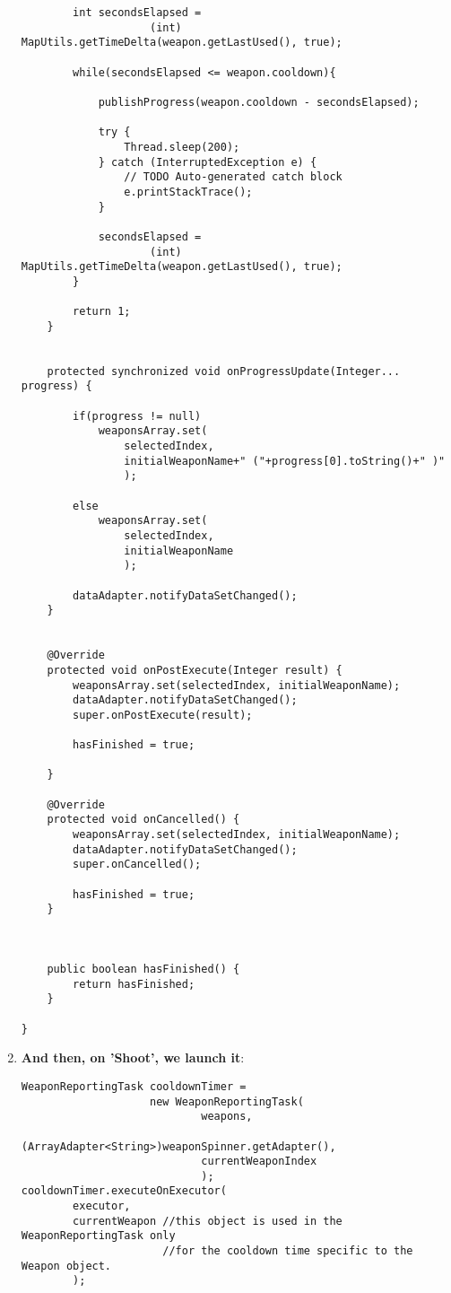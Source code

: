\begin{enumerate}
\begin{verbatim}
 		int secondsElapsed = 
 					(int) MapUtils.getTimeDelta(weapon.getLastUsed(), true);
 		
 		while(secondsElapsed <= weapon.cooldown){
 			
 			publishProgress(weapon.cooldown - secondsElapsed);
 			
 			try {
				Thread.sleep(200);
			} catch (InterruptedException e) {
				// TODO Auto-generated catch block
				e.printStackTrace();
			}
 			
 			secondsElapsed = 
 					(int) MapUtils.getTimeDelta(weapon.getLastUsed(), true);
 		}
 		
 		return 1;
 	}
     
    
    protected synchronized void onProgressUpdate(Integer... progress) {
    	
    	if(progress != null)
    		weaponsArray.set(
    			selectedIndex, 
    			initialWeaponName+" ("+progress[0].toString()+" )"
    			);
    	
    	else 
    		weaponsArray.set(
    			selectedIndex, 
    			initialWeaponName
    			);
    	
    	dataAdapter.notifyDataSetChanged();
    }

    
    @Override
    protected void onPostExecute(Integer result) {
    	weaponsArray.set(selectedIndex, initialWeaponName);
    	dataAdapter.notifyDataSetChanged();    	
    	super.onPostExecute(result);
    	
    	hasFinished = true;
    	
    }
    
    @Override
    protected void onCancelled() {
    	weaponsArray.set(selectedIndex, initialWeaponName);
    	dataAdapter.notifyDataSetChanged();
    	super.onCancelled();
    	
    	hasFinished = true;
    }



	public boolean hasFinished() {
		return hasFinished;
	}
    
}

\end{verbatim}

  \item \textbf{And then, on 'Shoot', we launch it}:

\begin{verbatim}
WeaponReportingTask cooldownTimer = 
					new WeaponReportingTask(
							weapons,
							(ArrayAdapter<String>)weaponSpinner.getAdapter(),
							currentWeaponIndex
							);
cooldownTimer.executeOnExecutor(
		executor,
		currentWeapon //this object is used in the WeaponReportingTask only  
					  //for the cooldown time specific to the Weapon object.
		);
\end{verbatim}


\end{enumerate}

